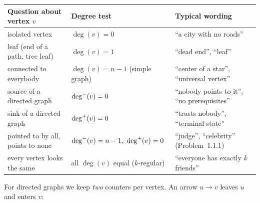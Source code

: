 \begin{table}[H]
\centering\small
\renewcommand{\arraystretch}{1.2}
\begin{tabularx}{\linewidth}{@{}>{\raggedright\arraybackslash}p{3.7cm} >{\raggedright\arraybackslash}p{3.5cm} X@{}}
\toprule
\textbf{Question about vertex $v$} & \textbf{Degree test} & \textbf{Typical wording} \\
\midrule
isolated vertex & $\deg(v) = 0$ & ``a city with no roads'' \\
leaf (end of a path, tree leaf) & $\deg(v) = 1$ & ``dead end'', ``leaf'' \\
connected to everybody & $\deg(v) = n-1$ (simple graph) & ``center of a star'', ``universal vertex'' \\
source of a directed graph & $\deg^{-}(v) = 0$ & ``nobody points to it'', ``no prerequisites'' \\
sink of a directed graph & $\deg^{+}(v) = 0$ & ``trusts nobody'', ``terminal state'' \\
pointed to by all, points to none & $\indeg{v}=n-1,\ \outdeg{v}=0$ & ``judge'', ``celebrity'' (Problem~1.1.1) \\
every vertex looks the same & all $\deg(v)$ equal ($k$-regular) & ``everyone has exactly $k$ friends'' \\
\bottomrule
\end{tabularx}
\end{table}

For directed graphs we keep \emph{two} counters per vertex. An arrow $u \to v$ leaves $u$ and enters $v$:

\begin{diagrambox}
\end{diagrambox}

